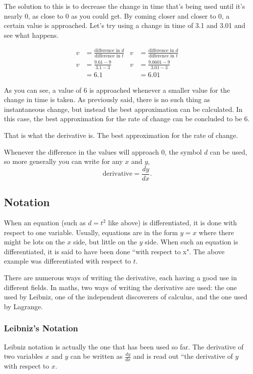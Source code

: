 The solution to this is to decrease the change in time that's being used until it's nearly $0$, as close to $0$ as you could get. By coming closer and closer to 0, a certain value is approached. Let's try using a change in time of 3.1 and 3.01 and see what happens.

\begin{align*}
	v&=\frac{\text{difference in $d$}}{\text{difference in $t$}} & v&=\frac{\text{difference in $d$}}{\text{difference in $t$}}\\[0.75em]
	v &= \frac{9.61-9}{3.1-3} & v &= \frac{9.0601-9}{3.01-3}\\
	&= 6.1 & &= 6.01
\end{align*}

As you can see, a value of $6$ is approached whenever a smaller value for the change in time is taken. As previously said, there is no such thing as instantaneous change, but instead the best approximation can be calculated. In this case, the best approximation for the rate of change can be concluded to be $6$.

That is what the derivative is. The best approximation for the rate of change.

Whenever the difference in the values will approach $0$, the symbol $d$ can be used, so more generally you can write for any $x$ and $y$,
\begin{equation}
	\text{derivative} = \frac{dy}{dx}\text{.}
\end{equation}

\subsection{Notation}
When an equation (such as $d=t^2$ like above) is differentiated, it is done with respect to one variable. Usually, equations are in the form $y=x$ where there might be lots on the $x$ side, but little on the $y$ side. When such an equation is differentiated, it is said to have been done ``with respect to x". The above example was differentiated with respect to $t$.

There are numerous ways of writing the derivative, each having a good use in different fields. In maths, two ways of writing the derivative are used: the one used by Leibniz, one of the independent discoverers of calculus, and the one used by Lagrange.

\subsubsection{Leibniz's Notation}
Leibniz notation is actually the one that has been used so far. The derivative of two variables $x$ and $y$ can be written as $\frac{dy}{dx}$ and is read out ``the derivative of $y$ with respect to $x$.

